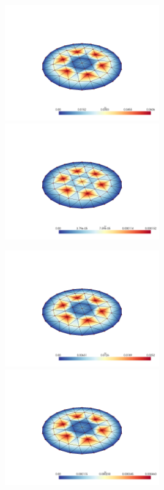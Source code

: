 \documentclass[
  11pt,
]{article}
\let\origfigure\figure
\let\endorigfigure\endfigure
\renewenvironment{figure}[1][2] {
    \expandafter\origfigure\expandafter[H]
} {
    \endorigfigure
}
\begin{document}
\includegraphics[width=0.5\textwidth,height=\textheight]{../img/mesh1-gauss02-b-L2.png}
\includegraphics[width=0.5\textwidth,height=\textheight]{../img/mesh1-gauss02-b-H1.png}

\begin{figure}
\caption{Finite element error in the L2 and H1 norms/seminorms, respectively for problem 1 over mesh number 1 using order 2 quadrature.}
\end{figure}

\includegraphics[width=0.5\textwidth,height=\textheight]{../img/mesh1-gauss05-b-L2.png}
\includegraphics[width=0.5\textwidth,height=\textheight]{../img/mesh1-gauss05-b-H1.png}
\end{document}
